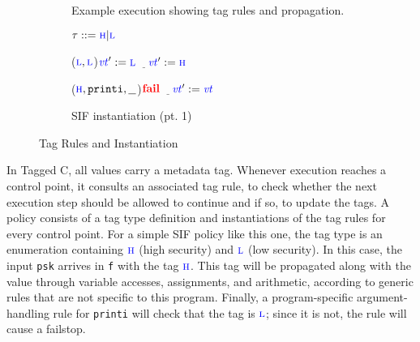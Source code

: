 \begin{figure}[t]
\begin{subfigure}{0.65\textwidth}

  \caption{Example execution showing tag rules and propagation.}
  \label{ch4:fig:ex1}
  \end{subfigure}
  \begin{subfigure}{0.34\textwidth}
    \scriptsize
    \(\tau::=\textnormal{\color{blue} \sc h} | \textnormal{\color{blue} \sc l}\)

    \binoptexruleblock
        {\caseoftwo{\((\vt[_1],\vt[_2])\)}
          {(\(\textnormal{\color{blue} \sc l},\textnormal{\color{blue} \sc l}\))}{\(\mathit{\color{blue} vt}':=\textnormal{\color{blue} \sc l}\)}
          {\(\underline{~~~}\)}{\(\mathit{\color{blue} vt}':=\textnormal{\color{blue} \sc h}\)}}

    \argtexruleblock
        {\caseoftwo{\((\vt,\FN,\AN)\)}
          {(\(\textnormal{\color{blue} \sc h},\mathtt{printi},\underline{~~}\))}{\(\mathbf{\color{red} fail}\)}
          {\(\underline{~~~}\)}{\(\mathit{\color{blue} vt}':=\mathit{\color{blue} vt}\)}}
  
  \caption{SIF instantiation (pt. 1)}
  \label{ch4:fig:example1rules}
  \end{subfigure}

  \caption{Tag Rules and Instantiation}

\end{figure}

In Tagged C, all values carry a metadata tag. Whenever execution reaches a control point, it consults
an associated tag rule, to check whether the next execution step should be allowed to continue and
if so, to update the tags. A policy consists of a tag type definition and instantiations of the tag
rules for every control point. For a simple SIF policy like this one, the tag type is an enumeration
containing \(\textnormal{\color{blue} \sc h}\) (high security) and \(\textnormal{\color{blue} \sc l}\) (low security).
In this case, the input {\tt psk} arrives in {\tt f} with the tag \(\textnormal{\color{blue} \sc h}\).
This tag will be propagated along with the value through variable accesses,
assignments, and arithmetic, according to generic rules that are not specific to this program.
Finally, a program-specific argument-handling rule for {\tt printi} will check that the tag is
\(\textnormal{\color{blue} \sc l}\); since it is not, the rule will cause a failstop.

